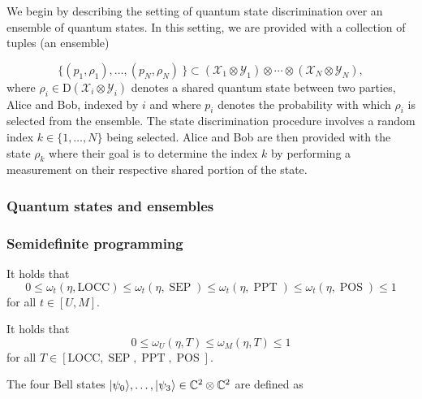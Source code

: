 \documentclass[11pt]{article}
\theoremstyle{definition}
\newcommand{\microspace}{\mspace{0.5mu}}
\newcommand{\POS}{\operatorname{POS}}
\newcommand{\PPT}{\operatorname{PPT}}
\newcommand{\SEP}{\operatorname{SEP}}
\newcommand{\ket}[1]{
  \lvert\microspace #1 \microspace \rangle}
\newcommand{\setft}[1]{\mathrm{#1}}
\newcommand{\Density}{\setft{D}}
\newcommand{\complex}{\mathbb{C}}
\newcommand{\X}{\mathcal{X}}
\newcommand{\Y}{\mathcal{Y}}
\newcommand{\LOCC}{\text{LOCC}}
\begin{document}
We begin by describing the setting of quantum state discrimination over an
ensemble of quantum states. In this setting, we are provided with a collection
of tuples (an ensemble)

\begin{equation}
    \{(p_1, \rho_1), \ldots, (p_N, \rho_N) \ \} \subset 
    (\X_1 \otimes \Y_1) \otimes \cdots \otimes (\X_N \otimes \Y_N),
\end{equation}
where $\rho_i \in \Density(\X_i \otimes \Y_i)$ denotes a shared quantum state
between two parties, Alice and Bob, indexed by $i$ and where $p_i$ denotes the
probability with which $\rho_i$ is selected from the ensemble. The state
discrimination procedure involves a random index $k \in \{1, \ldots, N\}$ being
selected. Alice and Bob are then provided with the state $\rho_k$ where their
goal is to determine the index $k$ by performing a measurement on their
respective shared portion of the state. 

\subsubsection*{Quantum states and ensembles}
\label{sec:quantum_states_and_ensembles}

\subsubsection*{Semidefinite programming}
\label{sec:semidefinite_programming}

It holds that
\begin{equation}
    0 \leq \omega_t(\eta, \LOCC) \leq \omega_t(\eta, \SEP) \leq \omega_t(\eta, \PPT) \leq \omega_t(\eta, \POS) \leq 1
\end{equation}
for all $t \in [U, M]$.

It holds that
\begin{equation}
    0 \leq \omega_U(\eta, T) \leq \omega_M(\eta, T) \leq 1
\end{equation}
for all $T \in [\LOCC, \SEP, \PPT, \POS]$.

The four Bell states $\ket{\psi_0}, \ldots, \ket{\psi_3} \in \complex^2 \otimes
\complex^2$ are defined as
\end{document}
